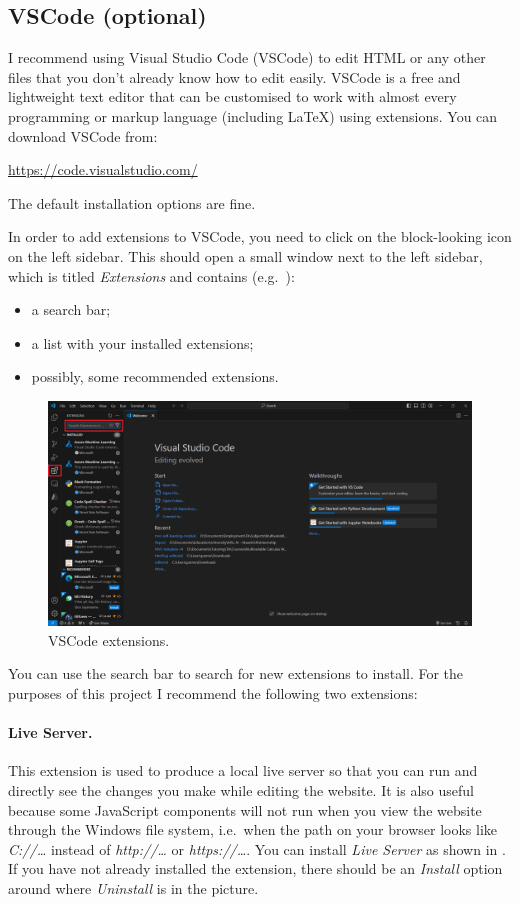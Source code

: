 \documentclass[a4paper,10pt]{article}
\begin{document}
\subsection{VSCode (optional)}
\label{sec:vscode}

I recommend using Visual Studio Code (VSCode) to edit HTML or any other files that you don't already know how to edit easily. VSCode is a free and lightweight text editor that can be customised to work with almost every programming or markup language (including \LaTeX) using extensions. You can download VSCode from:

\url{https://code.visualstudio.com/}

The default installation options are fine.

In order to add extensions to VSCode, you need to click on the block-looking icon on the left sidebar. This should open a small window next to the left sidebar, which is titled \emph{Extensions} and contains (e.g.\ ):
\begin{itemize}
    \item a search bar;
    \item a list with your installed extensions;
    \item possibly, some recommended extensions.
\end{itemize}

\begin{figure}[htbp]
    \centering
    \includegraphics[width=\textwidth]{extensions.png}
    \caption{VSCode extensions.}
    \label{fig:extensions}   
\end{figure}

You can use the search bar to search for new extensions to install. For the purposes of this project I recommend the following two extensions:

\paragraph{Live Server.} This extension is used to produce a local live server so that you can run and directly see the changes you make while editing the website. It is also useful because some JavaScript components will not run when you view the website through the Windows file system, i.e.\ when the path on your browser looks like \emph{C://\dots} instead of \emph{http://\dots} or \emph{https://\dots}. You can install \emph{Live Server} as shown in . If you have not already installed the extension, there should be an \emph{Install} option around where \emph{Uninstall} is in the picture.
\end{document}
